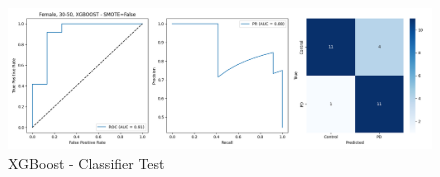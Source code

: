 \documentclass[12pt]{report}
\begin{document}
                \begin{figure}[H]
                    \centering
                    \includegraphics[width=1\textwidth]{ML/Predict/DEG/AUC/results_stratified_Female_30-50_XGBOOST_useSMOTE_False.png}
                    \caption*{XGBoost - Classifier Test}
                    \label{fig:app_xgb_females_30_50_test}
                \end{figure}                 
\end{document}
